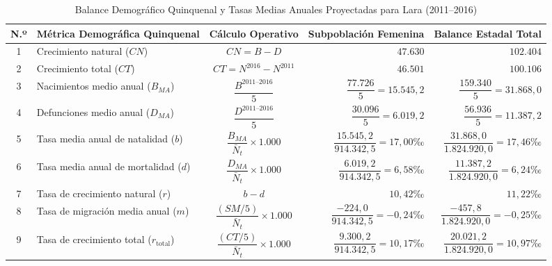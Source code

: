 \documentclass[12pt,letterpaper]{article}
\begin{document}
\begin{table}[htbp]
    \centering
    \caption{Balance Demográfico Quinquenal y Tasas Medias Anuales Proyectadas para Lara (2011--2016)}
    \label{tab:indicadores_resumen}
    \footnotesize
    \setlength{\tabcolsep}{4pt}
    \renewcommand{\arraystretch}{1.25}
    \begin{tabularx}{\textwidth}{c>{\raggedright\arraybackslash}Xcrr}
        \toprule
        \textbf{N.º} & \textbf{Métrica Demográfica Quinquenal} & \textbf{Cálculo Operativo} & \textbf{Subpoblación Femenina} & \textbf{Balance Estadal Total} \\
        \midrule
        1 & Crecimiento natural ($CN$) & $CN = B - D$ & $47.630$ & $102.404$ \\
        2 & Crecimiento total ($CT$) & $CT = N^{2016} - N^{2011}$ & $46.501$ & $100.106$ \\
        \midrule
        3 & Nacimientos medio anual ($B_{MA}$) & $\dfrac{B^{2011\text{--}2016}}{5}$ & $\dfrac{77.726}{5} = 15.545{,}2$ & $\dfrac{159.340}{5} = 31.868{,}0$ \\
        4 & Defunciones medio anual ($D_{MA}$) & $\dfrac{D^{2011\text{--}2016}}{5}$ & $\dfrac{30.096}{5} = 6.019{,}2$ & $\dfrac{56.936}{5} = 11.387{,}2$ \\
        \midrule
        5 & Tasa media anual de natalidad ($b$) & $\dfrac{B_{MA}}{\bar{N}_t} \times 1.000$ & $\dfrac{15.545{,}2}{914.342{,}5} = 17{,}00\text{‰}$ & $\dfrac{31.868{,}0}{1.824.920{,}0} = 17{,}46\text{‰}$ \\
        6 & Tasa media anual de mortalidad ($d$) & $\dfrac{D_{MA}}{\bar{N}_t} \times 1.000$ & $\dfrac{6.019{,}2}{914.342{,}5} = 6{,}58\text{‰}$ & $\dfrac{11.387{,}2}{1.824.920{,}0} = 6{,}24\text{‰}$ \\
        7 & Tasa de crecimiento natural ($r$) & $b - d$ & $10{,}42\text{‰}$ & $11{,}22\text{‰}$ \\
        8 & Tasa de migración media anual ($m$) & $\dfrac{(SM/5)}{\bar{N}_t} \times 1.000$ & $\dfrac{-224{,}0}{914.342{,}5} = -0{,}24\text{‰}$ & $\dfrac{-457{,}8}{1.824.920{,}0} = -0{,}25\text{‰}$ \\
        9 & Tasa de crecimiento total ($r_{\text{total}}$) & $\dfrac{(CT/5)}{\bar{N}_t} \times 1.000$ & $\dfrac{9.300{,}2}{914.342{,}5} = 10{,}17\text{‰}$ & $\dfrac{20.021{,}2}{1.824.920{,}0} = 10{,}97\text{‰}$ \\
        \bottomrule
    \end{tabularx}

\end{table}
\end{document}
